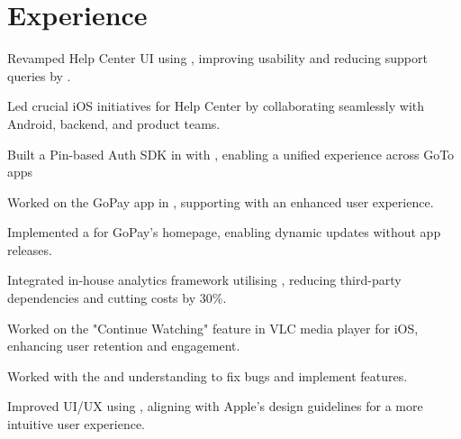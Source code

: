 \documentclass{fonts}
\begin{document}
%
%


\section{Experience}
\textbf{\href{https://www.gojek.io/}{}} 
\begin{tightemize}
    \item Revamped Help Center UI using , improving usability and reducing support queries by .
    \item Led crucial iOS initiatives for Help Center by collaborating seamlessly with Android, backend, and product teams.
    \item Built a Pin-based Auth SDK in  with , enabling a unified experience across GoTo apps
    \item Worked on the GoPay app in , supporting  with an enhanced user experience.
    \item Implemented a  for GoPay's homepage, enabling dynamic updates without app releases.
    \item Integrated in-house analytics framework utilising , reducing third-party dependencies and cutting costs by 30\%.
\end{tightemize}
\sectionsep

\textbf{\href{https://summerofcode.withgoogle.com/projects/6623823417311232}{}} 
\begin{tightemize}
    \item Worked on the "Continue Watching" feature in VLC media player for iOS, enhancing user retention and engagement.
    \item Worked with the  and understanding  to fix bugs and implement features.
    \item Improved UI/UX using , aligning with Apple's design guidelines for a more intuitive user experience.
\end{tightemize}
\end{document}
